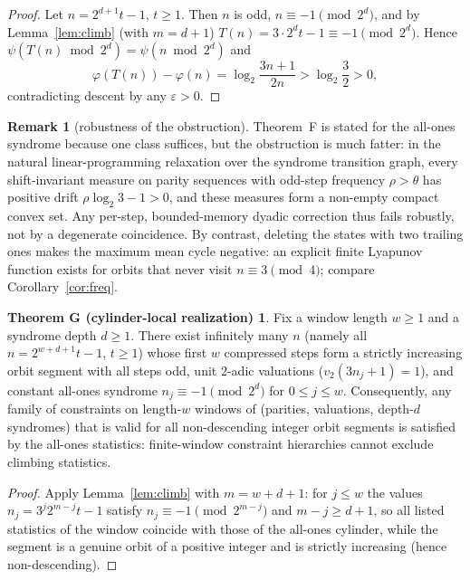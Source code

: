 \documentclass[11pt]{article}
\theoremstyle{definition}
\newtheorem{remark}[theorem]{Remark}
\newtheorem*{thmG}{Theorem G (cylinder-local realization)}
\begin{document}
\begin{proof}
Let $n=2^{d+1}t-1$, $t\ge 1$. Then $n$ is odd, $n\equiv -1\pmod{2^d}$, and
by Lemma~\ref{lem:climb} (with $m=d+1$) $T(n)=3\cdot 2^{d}t-1\equiv -1
\pmod{2^d}$. Hence $\psi(T(n)\bmod 2^d)=\psi(n\bmod 2^d)$ and
\[
\varphi(T(n))-\varphi(n)=\log_2\frac{3n+1}{2n}>\log_2\frac32>0 ,
\]
contradicting descent by any $\varepsilon>0$.
\end{proof}

\begin{remark}[robustness of the obstruction]\label{rem:simplex}
Theorem~F is stated for the all-ones syndrome because one class suffices,
but the obstruction is much fatter: in the natural linear-programming
relaxation over the syndrome transition graph, every shift-invariant
measure on parity sequences with odd-step frequency $\rho>\theta$ has
positive drift $\rho\log_2 3-1>0$, and these measures form a non-empty
compact convex set. Any per-step, bounded-memory dyadic correction thus
fails robustly, not by a degenerate coincidence. By contrast, deleting the
states with two trailing ones makes the maximum mean cycle negative: an
explicit finite Lyapunov function exists for orbits that never visit
$n\equiv 3\pmod 4$; compare Corollary~\ref{cor:freq}.
\end{remark}

\begin{thmG}
Fix a window length $w\ge 1$ and a syndrome depth $d\ge 1$. There exist
infinitely many $n$ (namely all $n=2^{w+d+1}t-1$, $t\ge 1$) whose first $w$
compressed steps form a strictly increasing orbit segment with all steps
odd, unit $2$-adic valuations ($v_2(3n_j+1)=1$), and constant all-ones
syndrome $n_j\equiv -1 \pmod{2^d}$ for $0\le j\le w$. Consequently, any
family of constraints on length-$w$ windows of (parities, valuations,
depth-$d$ syndromes) that is valid for all non-descending integer orbit
segments is satisfied by the all-ones statistics: finite-window constraint
hierarchies cannot exclude climbing statistics.
\end{thmG}

\begin{proof}
Apply Lemma~\ref{lem:climb} with $m=w+d+1$: for $j\le w$ the values
$n_j=3^j2^{m-j}t-1$ satisfy $n_j\equiv -1\pmod{2^{m-j}}$ and $m-j\ge d+1$,
so all listed statistics of the window coincide with those of the all-ones
cylinder, while the segment is a genuine orbit of a positive integer and is
strictly increasing (hence non-descending).
\end{proof}
\end{document}
